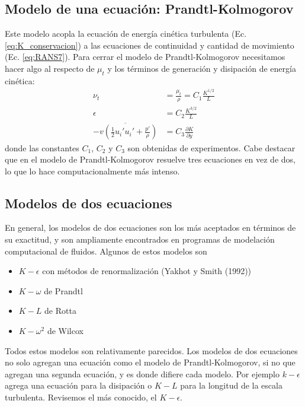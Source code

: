 \subsection*{Modelo de una ecuación: Prandtl-Kolmogorov}
Este modelo acopla la ecuación de energía cinética turbulenta (Ec. \eqref{eq:K_conservacion}) a las ecuaciones de continuidad y cantidad de movimiento (Ec. \eqref{eq:RANS7}).
Para cerrar el modelo de Prandtl-Kolmogorov necesitamos hacer algo al respecto de $\mu_t$ y los términos de generación y disipación de energía cinética:
%
\begin{align}
\nu_t &= \frac{\mu_t}{\rho} = C_1\frac{K^{1/2}}{L} \nonumber\\ 
\epsilon &= C_2\frac{K^{3/2}}{L} \nonumber\\
\overline{-v\left(\frac{1}{2}u_i'u_i'+\frac{p'}{\rho}\right)} &= C_3\frac{\partial K}{\partial y}
\end{align}
%
donde las constantes $C_1$, $C_2$ y $C_3$ son obtenidas de experimentos.
Cabe destacar que en el modelo de Prandtl-Kolmogorov resuelve tres ecuaciones en vez de dos, lo que lo hace computacionalmente más intenso.


\subsection*{Modelos de dos ecuaciones}
En general, los modelos de dos ecuaciones son los más aceptados en términos de su exactitud, y son ampliamente encontrados en programas de modelación computacional de fluidos.
Algunos de estos modelos son
%
\begin{itemize}
\item $K-\epsilon$ con métodos de renormalización (Yakhot y Smith (1992))
\item $K-\omega$ de Prandtl
\item $K-L$ de Rotta
\item $K-\omega^2$ de Wilcox
\end{itemize}

Todos estos modelos son relativamente parecidos.
Los modelos de dos ecuaciones no solo agregan una ecuación como el modelo de Prandtl-Kolmogorov, si no que agregan una segunda ecuación, y es donde difiere cada modelo.
Por ejemplo $k-\epsilon$ agrega una ecuación para la disipación o $K-L$ para la longitud de la escala turbulenta.
Revisemos el más conocido, el $K-\epsilon$.

